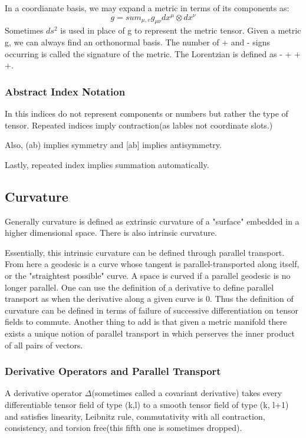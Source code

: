 In a coordianate basis, we may expand a metric in terms of its components as:
\[
g= sum_{\mu,v} g_{\mu \nu} dx^\mu \otimes dx^{\nu}
  \]
  Sometimes $ds^2$ is used in place of g to represent the metric tensor. Given a metric g, we can always find an orthonormal basis. The number of + and - signs occurring is called the signature of the metric. The Lorentzian is defined as - + + +.

\subsubsection{Abstract Index Notation}
In this indices do not represent components or numbers but rather the type of tensor. Repeated indices imply contraction(as lables not coordinate slots.)

Also, (ab) implies symmetry and [ab] implies antisymmetry.

Lastly, repeated index implies summation automatically.

\subsection{Curvature}
Generally curvature is defined as extrinsic curvature of a "surface" embedded in a higher dimensional space. There is also intrinsic curvature.

Essentially, this intrinsic curvature can be defined through parallel transport. From here a geodesic is a curve whose tangent is parallel-transported along itself, or the "straightest possible" curve. A space is curved if a parallel geodesic is no longer parallel. One can use the definition of a derivative to define parallel transport as when the derivative along a given curve is 0. Thus the definition of curvature can be defined in terms of failure of successive differentiation on tensor fields to commute. Another thing to add is that given a metric manifold there exists a unique notion of parallel transport in which perserves the inner product of all pairs of vectors.

\subsubsection{Derivative Operators and Parallel Transport}

A derivative operator $\Delta$(sometimes called a covariant derivative) takes every differentiable tensor field of type (k,l) to a smooth tensor field of type (k, l+1) and satisfies linearity, Leibnitz rule, commutativity with all contraction, consistency, and torsion free(this fifth one is sometimes dropped).

